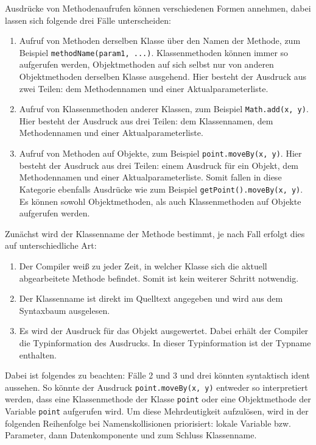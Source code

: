 Ausdrücke von Methodenaufrufen können verschiedenen Formen annehmen, dabei lassen sich folgende drei Fälle unterscheiden:
\begin{enumerate}
    \item Aufruf von Methoden derselben Klasse über den Namen der Methode, zum Beispiel \lstinline{methodName(param1, ...)}. Klassenmethoden können immer so aufgerufen werden, Objektmethoden auf sich selbst nur von anderen Objektmethoden derselben Klasse ausgehend. Hier besteht der Ausdruck aus zwei Teilen: dem Methodennamen und einer Aktualparameterliste.
    \item Aufruf von Klassenmethoden anderer Klassen, zum Beispiel \lstinline{Math.add(x, y)}. Hier besteht der Ausdruck aus drei Teilen: dem Klassennamen, dem Methodennamen und einer Aktualparameterliste.
    \item Aufruf von Methoden auf Objekte, zum Beispiel \lstinline{point.moveBy(x, y)}. Hier besteht der Ausdruck aus drei Teilen: einem Ausdruck für ein Objekt, dem Methodennamen und einer Aktualparameterliste. Somit fallen in diese Kategorie ebenfalls Ausdrücke wie zum Beispiel \lstinline{getPoint().moveBy(x, y)}. Es können sowohl Objektmethoden, als auch Klassenmethoden auf Objekte aufgerufen werden.
\end{enumerate}

Zunächst wird der Klassenname der Methode bestimmt, je nach Fall erfolgt dies auf unterschiedliche Art:
\begin{enumerate}
    \item Der Compiler weiß zu jeder Zeit, in welcher Klasse sich die aktuell abgearbeitete Methode befindet. Somit ist kein weiterer Schritt notwendig.
    \item Der Klassenname ist direkt im Quelltext angegeben und wird aus dem Syntaxbaum ausgelesen.
    \item Es wird der Ausdruck für das Objekt ausgewertet. Dabei erhält der Compiler die Typinformation des Ausdrucks. In dieser Typinformation ist der Typname enthalten.
\end{enumerate}

Dabei ist folgendes zu beachten: Fälle 2 und 3 und drei könnten syntaktisch ident aussehen. So könnte der Ausdruck \lstinline{point.moveBy(x, y)} entweder so interpretiert werden, dass eine Klassenmethode der Klasse \lstinline{point} oder eine Objektmethode der Variable \lstinline{point} aufgerufen wird. Um diese Mehrdeutigkeit aufzulösen, wird in der folgenden Reihenfolge bei Namenskollisionen priorisiert: lokale Variable bzw. Parameter, dann Datenkomponente und zum Schluss Klassenname.

